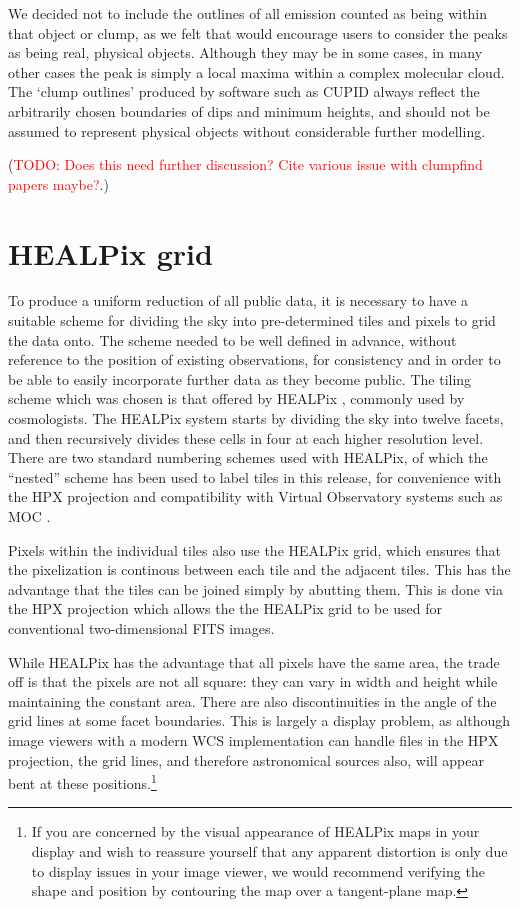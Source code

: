 \documentclass[twocolumn,times]{aastex6}
\newcommand{\todo}[1]{\textcolor{red}{TODO: #1}}
\begin{document}
We decided not to include the outlines of all emission counted as
being within that object or clump, as we felt that would encourage
users to consider the peaks as being real, physical objects. Although
they may be in some cases, in many other cases the peak is simply a
local maxima within a complex molecular cloud. The `clump outlines'
produced by software such as CUPID always reflect the arbitrarily
chosen boundaries of dips and minimum heights, and should not be
assumed to represent physical objects without considerable further
modelling.

(\todo{Does this need further discussion? Cite various issue with clumpfind papers maybe?}.)


\section{HEALPix grid}
\label{sec:healpix}

To produce a uniform reduction of all public data, it is necessary to
have a suitable scheme for dividing the sky into pre-determined tiles
and pixels to grid the data onto.  The scheme needed to be well
defined in advance, without reference to the position of existing
observations, for consistency and in order to be able to easily
incorporate further data as they become public.  The tiling scheme
which was chosen is that offered by HEALPix \citep[Hierarchical Equal
Area isoLatitude Pixelization,][]{Gorski2005}, commonly used by
cosmologists. The HEALPix system starts by dividing the sky into
twelve facets, and then recursively divides these cells in four at each
higher resolution level.  There are two standard numbering schemes
used with HEALPix, of which the ``nested'' scheme has been used to
label tiles in this release, for convenience with the HPX projection
and compatibility with Virtual Observatory systems such as MOC
\citep[Multi-Order Coverage,][]{2013ASPC..475..135F}.

Pixels within the individual tiles also use the HEALPix grid, which
ensures that the pixelization is continous between each tile and the
adjacent tiles.  This has the advantage that the tiles can be joined
simply by abutting them.  This is done via the HPX projection
\citep{Calabretta2007} which allows the the HEALPix grid to be used
for conventional two-dimensional FITS images.

While HEALPix has the advantage that all pixels have the same area,
the trade off is that the pixels are not all square: they can vary in
width and height while maintaining the constant area.  There are also
discontinuities in the angle of the grid lines at some facet
boundaries.  This is largely a display problem, as although image
viewers with a modern WCS implementation can handle files in the HPX
projection, the grid lines, and therefore astronomical sources also,
will appear bent at these positions.\footnote{If you are concerned by
  the visual appearance of HEALPix maps in your display and wish to
  reassure yourself that any apparent distortion is only due to
  display issues in your image viewer, we would recommend verifying
  the shape and position by contouring the map over a tangent-plane
  map.}
\end{document}
